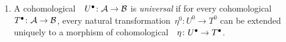 \begin{definition}
\begin{enumerate}
    \item
      A cohomological~{\deltafun}~$U^\bullet \colon \mathcal{A} \to \mathcal{B}$ is \emph{universal} if for every cohomological~{\deltafun}~$T^\bullet \colon \mathcal{A} \to \mathcal{B}$, every natural transformation~$\eta^0 \colon U^0 \to T^0$ can be extended uniquely to a morphism of cohomological~{\deltafuns}~$\eta \colon U^\bullet \to T^\bullet$.
  \end{enumerate}
\end{definition}









